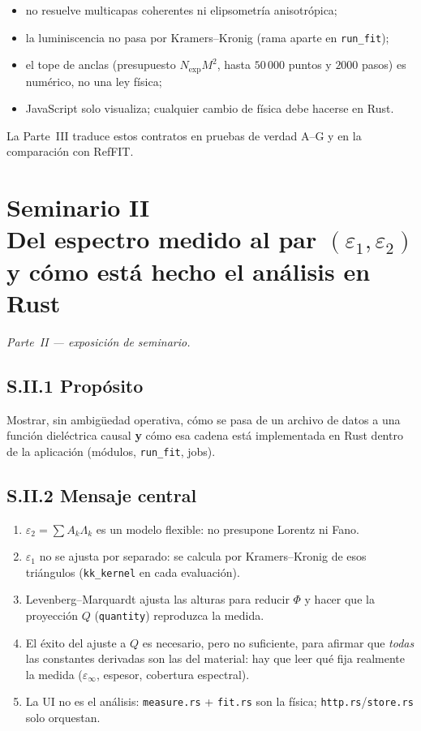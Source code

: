 \begin{itemize}[leftmargin=*]
\item no resuelve multicapas coherentes ni elipsometr\'ia anisotr\'opica;
\item la luminiscencia no pasa por Kramers--Kronig (rama aparte en \texttt{run\_fit});
\item el tope de anclas (presupuesto $N_{\mathrm{exp}}M^{2}$, hasta $50\,000$ puntos y $2000$ pasos) es num\'erico, no una ley f\'isica;
\item JavaScript solo visualiza; cualquier cambio de f\'isica debe hacerse en Rust.
\end{itemize}

La Parte~III traduce estos contratos en pruebas de verdad A--G y en la comparaci\'on con RefFIT.


\chapter*{Seminario II\\Del espectro medido al par $(\varepsilon_1,\varepsilon_2)$\\y c\'omo est\'a hecho el an\'alisis en Rust}
\label{sem:2}

\noindent\textit{Parte~II --- exposici\'on de seminario.}

\section*{S.II.1 Prop\'osito}

Mostrar, sin ambig\"uedad operativa, c\'omo se pasa de un archivo de datos a una funci\'on diel\'ectrica causal \textbf{y} c\'omo esa cadena est\'a implementada en Rust dentro de la aplicaci\'on (m\'odulos, \texttt{run\_fit}, jobs).

\section*{S.II.2 Mensaje central}

\begin{enumerate}[leftmargin=*]
\item $\varepsilon_2=\sum A_k\Lambda_k$ es un modelo flexible: no presupone Lorentz ni Fano.
\item $\varepsilon_1$ no se ajusta por separado: se calcula por Kramers--Kronig de esos tri\'angulos (\texttt{kk\_kernel} en cada evaluaci\'on).
\item Levenberg--Marquardt ajusta las alturas para reducir $\Phi$ y hacer que la proyecci\'on $Q$ (\texttt{quantity}) reproduzca la medida.
\item El \'exito del ajuste a $Q$ es necesario, pero no suficiente, para afirmar que \emph{todas} las constantes derivadas son las del material: hay que leer qu\'e fija realmente la medida ($\varepsilon_\infty$, espesor, cobertura espectral).
\item La UI no es el an\'alisis: \texttt{measure.rs} + \texttt{fit.rs} son la f\'isica; \texttt{http.rs}/\texttt{store.rs} solo orquestan.
\end{enumerate}

